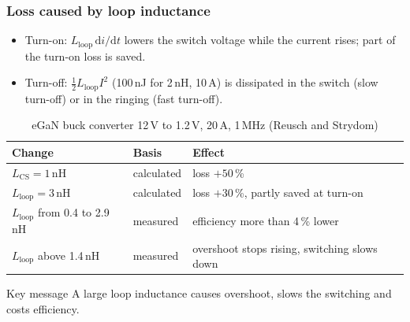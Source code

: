 \begin{frame}
	\frametitle{Loss caused by loop inductance}
	\begin{itemize}
		\item Turn-on: $L_\mathrm{loop}\,\mathrm{d}i/\mathrm{d}t$ lowers the switch voltage while the current rises; part of the turn-on loss is saved.
		\item Turn-off: $\frac12L_\mathrm{loop}I^2$ (100\,nJ for 2\,nH, 10\,A) is dissipated in the switch (slow turn-off) or in the ringing (fast turn-off).
	\end{itemize}
	\begin{table}
		\centering
		\small
		\begin{tabular}{|l|l|l|}
			\hline
			\textbf{Change}                                  & \textbf{Basis} & \textbf{Effect}                                   \\
			\hline
			$L_\mathrm{CS}=1$\,nH                            & calculated     & loss $+50$\,\%                                    \\
			$L_\mathrm{loop}=3$\,nH                          & calculated     & loss $+30$\,\%, partly saved at turn-on           \\
			$L_\mathrm{loop}$ from 0.4 to 2.9\,nH            & measured       & efficiency more than 4\,\% lower                 \\
			$L_\mathrm{loop}$ above 1.4\,nH                  & measured       & overshoot stops rising, switching slows down      \\
			\hline
		\end{tabular}
		\caption{eGaN buck converter 12\,V to 1.2\,V, 20\,A, 1\,MHz (Reusch and Strydom)}
	\end{table}
	\vspace{-0.6em}
	\begin{block}{Key message}
		A large loop inductance causes overshoot, slows the switching and costs efficiency.
	\end{block}
\end{frame}

